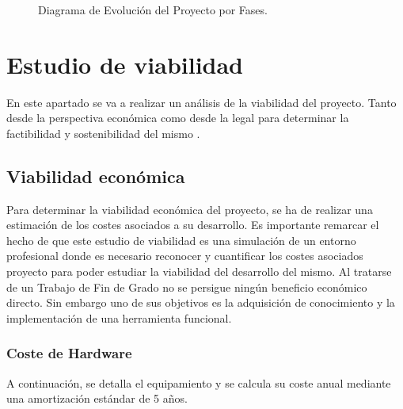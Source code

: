 \begin{figure}[H]
{
    } %
    \caption{Diagrama de Evolución del Proyecto por Fases.}
    \label{fig:diagrama_fases_tikz}
\end{figure}







\section{Estudio de viabilidad}
En este apartado se va a realizar un análisis de la viabilidad del proyecto.  Tanto  desde la perspectiva económica como  desde la legal para determinar la factibilidad y sostenibilidad del mismo .

\subsection{Viabilidad económica}
Para determinar la viabilidad económica del proyecto, se ha de realizar una estimación de los costes asociados a su desarrollo. Es importante remarcar el hecho de que este estudio de viabilidad es una simulación de un entorno profesional donde es necesario reconocer y cuantificar los costes asociados proyecto para poder estudiar la viabilidad del desarrollo del mismo.
Al tratarse de un Trabajo de Fin de Grado no se persigue ningún beneficio económico directo. Sin embargo uno de sus objetivos es la adquisición de conocimiento y la implementación de una herramienta funcional.

\subsubsection{Coste de Hardware}
A continuación, se detalla el equipamiento y se calcula su coste anual mediante una amortización estándar de 5 años.

